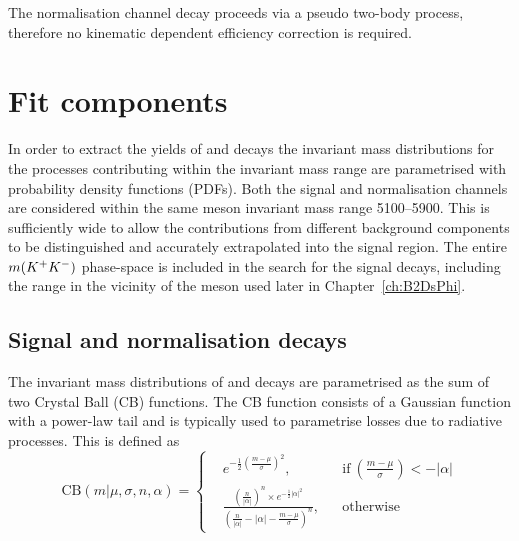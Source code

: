 The normalisation channel decay proceeds via a pseudo two-body process, therefore no kinematic dependent efficiency correction is required.  



\section{Fit components}
\label{sec:B2DsKK_fitcomps}

In order to extract the yields of \decay{\Bp}{\Dsp\Dzb} and \decay{\Bp}{\Dsp\Kp\Km} decays the invariant mass distributions for the processes contributing within the invariant mass range are parametrised with probability density functions (PDFs).
Both the signal and normalisation channels are considered within the same \Bp meson invariant mass range 5100--5900\mevcc. This is sufficiently wide to allow the contributions from different background components to be distinguished and accurately extrapolated into the signal region. The entire $m({{K}^+}{{K}^-})$ phase-space is included in the search for the signal decays, including the range in the vicinity of the \phiz meson used later in Chapter~\ref{ch:B2DsPhi}. 



\subsection{Signal and normalisation decays}
\label{sec:B2DsKK_sigcomps}

The invariant mass distributions of \decay{\Bp}{\Dsp\Dzb} and \decay{\Bp}{\Dsp\Kp\Km} decays are parametrised as the sum of two Crystal Ball (CB) functions.
The CB function consists of a Gaussian function with a power-law tail and is typically used to parametrise losses due to radiative processes.
This is defined as
\begin{equation}
\text{CB}(m|\mu,\sigma,n,\alpha) = \left \{
  \begin{aligned}
    &e^{-\frac{1}{2} \left(\frac{m-\mu}{\sigma}\right)^2}, && \text{if}\ \left(\frac{m-\mu}{\sigma}\right) < -|\alpha|\\
    &\frac{\left(\frac{n}{|\alpha|}\right)^n\times e ^{-\frac{1}{2}|\alpha|^2} }{\left(\frac{n}{|\alpha|}-|\alpha| - \frac{m-\mu}{\sigma}\right)^n}, && \text{otherwise}
  \end{aligned} \right.
\end{equation} 

